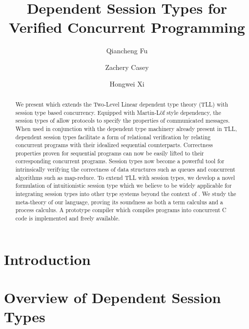 \documentclass[acmsmall,10pt,anonymous]{acmart}
\begin{document}
\title{Dependent Session Types for Verified Concurrent Programming}

\author{Qiancheng Fu}

\author{Zachery Casey}

\author{Hongwei Xi}

\begin{abstract}
We present \TLLC{} which extends the Two-Level Linear dependent type theory
(TLL) with session type based concurrency. Equipped with Martin-L\"{o}f style
dependency, the session types of \TLLC{} allow protocols to specify the
properties of communicated messages. When used in conjunction with the dependent
type machinery already present in TLL, dependent session types facilitate a
form of relational verification by relating concurrent programs with their
idealized sequential counterparts. Correctness properties proven for sequential
programs can now be easily lifted to their corresponding concurrent programs.
Session types now become a powerful tool for intrinsically verifying the
correctness of data structures such as queues and concurrent algorithms such as
map-reduce. To extend TLL with session types, we develop a novel formulation of
intuitionistic session type which we believe to be widely applicable for
integrating session types into other type systems beyond the context of \TLLC{}.
We study the meta-theory of our language, proving its soundness as both a term
calculus and a process calculus.
A prototype compiler which compiles \TLLC{} programs into concurrent C code is
implemented and freely available.
\end{abstract}

\maketitle

\section{Introduction}\label{sec:intro}


\section{Overview of Dependent Session Types}\label{sec:overview}

\end{document}
